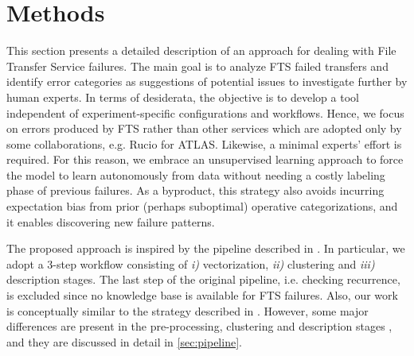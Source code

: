 \chapter{Methods}\label{ch:opint_methods}

This section presents a detailed description of an approach for dealing with File Transfer Service failures. %
The main goal is to analyze FTS failed transfers and identify error categories as suggestions of potential issues to investigate further by human experts.
In terms of desiderata, the objective is to develop a tool independent of experiment-specific configurations and workflows. Hence, we focus on errors produced by FTS rather than other services which are adopted only by some collaborations, e.g. Rucio for ATLAS.
Likewise, a minimal experts' effort is required. For this reason, we embrace an unsupervised learning approach to force the model to learn autonomously from data without needing a costly labeling phase of previous failures.
As a byproduct, this strategy also avoids incurring expectation bias from prior (perhaps suboptimal) operative categorizations, and it enables discovering new failure patterns.

The proposed approach \cite[Section 2.19]{opint2022} is inspired by the pipeline described in . %
In particular, we adopt a 3-step workflow consisting of \textit{i)} vectorization, \textit{ii)} clustering and \textit{iii)} description stages. 
The last step of the original pipeline, i.e. checking recurrence, is excluded since no knowledge base is available for FTS failures.
Also, our work is conceptually similar to the strategy described in . However, some major differences are present in the pre-processing, clustering and description stages%
, and they are discussed in detail in \cref{sec:pipeline}.

